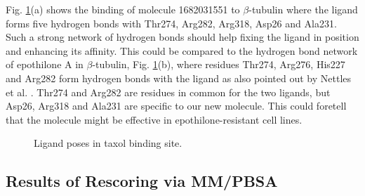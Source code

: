 \documentclass[11pt]{report}
\begin{document}
Fig. \ref{f:VS-Binding}(a) 
shows the binding of molecule 1682031551 to 
$\beta$-tubulin where the ligand forms five hydrogen bonds with Thr274, Arg282, Arg318, Asp26 and Ala231. Such a strong network of hydrogen bonds should help fixing the ligand in position and enhancing its affinity. This could be compared to the hydrogen bond network of epothilone A in $\beta$-tubulin, Fig.  \ref{f:VS-Binding}(b), 
where residues Thr274, Arg276, His227 and Arg282 form hydrogen bonds with the ligand as also pointed out by Nettles et al.
\cite{Nettles2004}. 
Thr274 and Arg282 are residues in common for the two ligands, but Asp26, Arg318 and Ala231 are specific to our new molecule. This could foretell that the molecule might be effective in epothilone-resistant cell lines.

\begin{figure}
\centering
{}
\hspace{0.1cm}
\caption{Ligand poses in taxol
binding site.}
\label{f:VS-Binding}
\end{figure}

\subsection{Results of Rescoring via MM/PBSA}
\label{ss:VS-Results_Rescoring}
\end{document}
